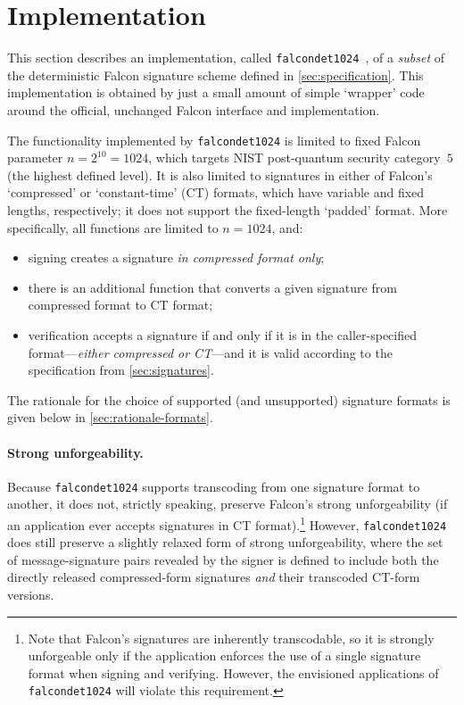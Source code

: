 \documentclass[11pt]{article}
\begin{document}



\newcommand{\fd}{\texttt{falcon\textunderscore det1024}\xspace}

\section{Implementation}
\label{sec:implementation}

This section describes an implementation, called
\fd~\cite{falcon_det1024}, of a \emph{subset} of the deterministic
Falcon signature scheme defined in \cref{sec:specification}. This
implementation is obtained by just a small amount of simple `wrapper'
code around the official, unchanged Falcon interface and
implementation.

The functionality implemented by \fd is limited to fixed Falcon
parameter $n=2^{10}=1024$, which targets NIST post-quantum security
category~$5$ (the highest defined level). It is also limited to
signatures in either of Falcon's `compressed' or `constant-time' (CT)
formats, which have variable and fixed lengths, respectively; it does
not support the fixed-length `padded' format. More specifically, all
functions are limited to $n=1024$, and:
\begin{itemize}[itemsep=0pt]
\item signing creates a signature \emph{in compressed format only};
\item there is an additional function that converts a given signature
  from compressed format to CT format;
\item verification accepts a signature if and only if it is in the
  caller-specified format---\emph{either compressed or CT}---and it is
  valid according to the specification from \cref{sec:signatures}.
\end{itemize}
The rationale for the choice of supported (and unsupported) signature
formats is given below in \cref{sec:rationale-formats}.

\paragraph{Strong unforgeability.}

Because \fd supports transcoding from one signature format to another,
it does not, strictly speaking, preserve Falcon's strong
unforgeability (if an application ever accepts signatures in CT
format).\footnote{Note that Falcon's signatures are inherently
  transcodable, so it is strongly unforgeable only if the application
  enforces the use of a single signature format when signing and
  verifying. However, the envisioned applications of \fd will violate
  this requirement.}  However, \fd does still preserve a slightly
relaxed form of strong unforgeability, where the set of
message-signature pairs revealed by the signer is defined to include
both the directly released compressed-form signatures \emph{and} their
transcoded CT-form versions.
\end{document}
